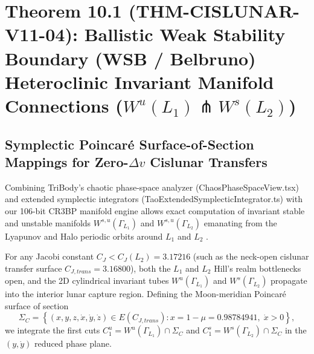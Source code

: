 \documentclass[11pt,a4paper,reqno]{article}
\def\texttt#1{#1}%
\def\mathrm#1{#1}%
\def\mathcal#1{#1}%
\def\mathbb#1{#1}%
\theoremstyle{plain}
\theoremstyle{definition}
\theoremstyle{remark}
\numberwithin{equation}{section}
\begin{document}
\section{\texorpdfstring{Theorem 10.1 (\texttt{THM-CISLUNAR-V11-04}): Ballistic Weak Stability Boundary (WSB / Belbruno) Heteroclinic Invariant Manifold Connections ($W^u(L_1) \pitchfork W^s(L_2)$)}{Theorem 10.1 (THM-CISLUNAR-V11-04): Ballistic Weak Stability Boundary (WSB / Belbruno) Heteroclinic Invariant Manifold Connections (W\^u(L\_1) pitchfork W\^s(L\_2))}}
\label{sec:cislunar_v11_wsb_heteroclinic}

\subsection{Symplectic Poincaré Surface-of-Section Mappings for Zero-\texorpdfstring{$\Delta v$}{Delta-v} Cislunar Transfers}
Combining TriBody's chaotic phase-space analyzer (\texttt{ChaosPhaseSpaceView.tsx}) and extended symplectic integrators (\texttt{TaoExtendedSymplecticIntegrator.ts}) with our 106-bit CR3BP manifold engine allows exact computation of invariant stable and unstable manifolds $W^{s,u}(\Gamma_{L_1})$ and $W^{s,u}(\Gamma_{L_2})$ emanating from the Lyapunov and Halo periodic orbits around $L_1$ and $L_2$ \cite{Belbruno2004, Koon2000}.

For any Jacobi constant $C_J < C_J(L_2) = 3.17216$ (such as the neck-open cislunar transfer surface $C_{J,\mathrm{trans}} = 3.16800$), both the $L_1$ and $L_2$ Hill's realm bottlenecks open, and the 2D cylindrical invariant tubes $W^u(\Gamma_{L_1})$ and $W^s(\Gamma_{L_2})$ propagate into the interior lunar capture region. Defining the Moon-meridian Poincaré surface of section
\begin{equation}
  \Sigma_{\mathbb{C}} = \left\{ (x, y, z, \dot{x}, \dot{y}, \dot{z}) \in \mathcal{E}(C_{J,\mathrm{trans}}) : x = 1 - \mu = 0.98784941,\; \dot{x} > 0 \right\},
  \label{eq:poincare_section_moon}
\end{equation}
we integrate the first cuts $\mathcal{C}_1^u = W^u(\Gamma_{L_1}) \cap \Sigma_{\mathbb{C}}$ and $\mathcal{C}_1^s = W^s(\Gamma_{L_2}) \cap \Sigma_{\mathbb{C}}$ in the $(y, \dot{y})$ reduced phase plane.
\end{document}
